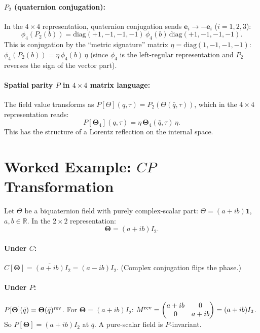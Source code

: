 \documentclass[12pt,a4paper]{article}
\theoremstyle{definition}
\theoremstyle{remark}
\begin{document}
\paragraph{$P_2$ (quaternion conjugation):}
In the $4\times4$ representation, quaternion conjugation sends
$\mathbf{e}_i\to -\mathbf{e}_i$ ($i=1,2,3$):
\begin{equation}
  \phi_4(P_2(b)) = \mathrm{diag}(+1,-1,-1,-1)\,\phi_4(b)\,\mathrm{diag}(+1,-1,-1,-1).
  \label{eq:mat:P2_4x4}
\end{equation}
This is conjugation by the ``metric signature'' matrix
$\eta = \mathrm{diag}(1,-1,-1,-1)$:
$\phi_4(P_2(b)) = \eta\,\phi_4(b)\,\eta$ (since $\phi_4$ is the left-regular
representation and $P_2$ reverses the sign of the vector part).

\paragraph{Spatial parity $P$ in $4\times4$ matrix language:}
The field value transforms as
$P[\Theta](q,\tau) = P_2(\Theta(\bar q,\tau))$, which in the $4\times4$
representation reads:
\begin{equation}
  P[\mathbf{\Theta}_{4}](q,\tau)
  = \eta\,\mathbf{\Theta}_{4}(\bar q, \tau)\,\eta.
  \label{eq:mat:P_4x4}
\end{equation}
This has the structure of a Lorentz reflection on the internal space.

\section{Worked Example: $CP$ Transformation}
\label{sec:mat:example_CP}

Let $\Theta$ be a biquaternion field with purely complex-scalar part:
$\Theta = (a + ib)\mathbf{1}$, $a,b\in\mathbb{R}$.  In the $2\times2$
representation:
\begin{equation}
  \mathbf{\Theta} = (a+ib)I_2.
\end{equation}

\paragraph{Under $C$:}
$C[\mathbf{\Theta}] = \overline{(a+ib)}I_2 = (a-ib)I_2$. \checkmark
(Complex conjugation flips the phase.)

\paragraph{Under $P$:}
$P[\mathbf{\Theta}](\bar q) = \mathbf{\Theta}(\bar q)^{\rm rev}$.
For $\mathbf{\Theta} = (a+ib)I_2$: $M^{\rm rev} = \begin{pmatrix}a+ib & 0\\0 & a+ib\end{pmatrix} = (a+ib)I_2$.
So $P[\mathbf{\Theta}] = (a+ib)I_2$ at $\bar q$.  A pure-scalar field is $P$-invariant. \checkmark
\end{document}
